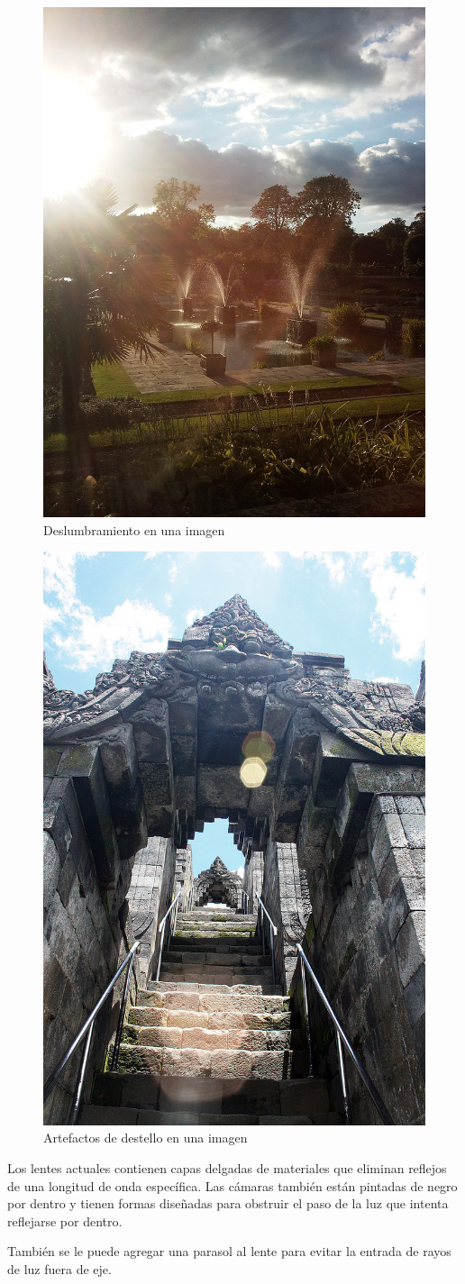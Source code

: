 \documentclass{article}
\begin{document}
\begin{figure}[H]
	\centering
	\includegraphics[width=0.45\linewidth]{Figuras/Flare_2}
	\caption{Deslumbramiento en una imagen}
	\label{fig:flare2}
\end{figure}

\begin{figure}[H]
	\centering
	\includegraphics[width=0.45\linewidth]{Figuras/Flare_3}
	\caption{Artefactos de destello en una imagen}
	\label{fig:flare3}
\end{figure}

\pagebreak

Los lentes actuales contienen capas delgadas de materiales que eliminan reflejos de una longitud de onda específica. Las cámaras también están pintadas de negro por dentro y tienen formas diseñadas para obstruir el paso de la luz que intenta reflejarse por dentro.

También se le puede agregar una parasol al lente para evitar la entrada de rayos de luz fuera de eje.
\end{document}
